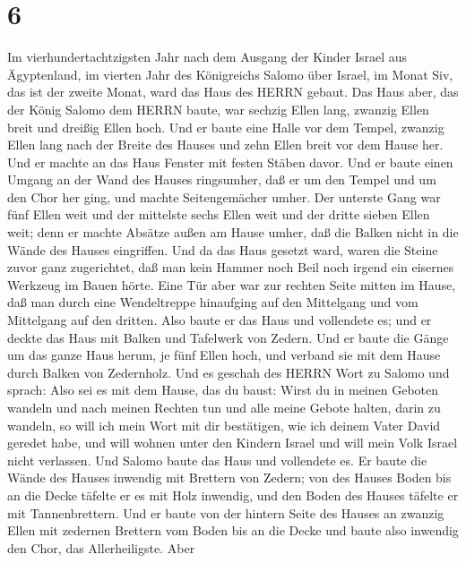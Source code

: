 \hypertarget{section-5}{%
\section{6}\label{section-5}}

 Im vierhundertachtzigsten Jahr nach dem Ausgang der Kinder
Israel aus Ägyptenland, im vierten Jahr des Königreichs Salomo über
Israel, im Monat Siv, das ist der zweite Monat, ward das Haus des HERRN
gebaut.  Das Haus aber, das der König Salomo dem HERRN
baute, war sechzig Ellen lang, zwanzig Ellen breit und dreißig Ellen
hoch.  Und er baute eine Halle vor dem Tempel, zwanzig Ellen
lang nach der Breite des Hauses und zehn Ellen breit vor dem Hause her.
 Und er machte an das Haus Fenster mit festen Stäben davor.
 Und er baute einen Umgang an der Wand des Hauses
ringsumher, daß er um den Tempel und um den Chor her ging, und machte
Seitengemächer umher.  Der unterste Gang war fünf Ellen weit
und der mittelste sechs Ellen weit und der dritte sieben Ellen weit;
denn er machte Absätze außen am Hause umher, daß die Balken nicht in die
Wände des Hauses eingriffen.  Und da das Haus gesetzt ward,
waren die Steine zuvor ganz zugerichtet, daß man kein Hammer noch Beil
noch irgend ein eisernes Werkzeug im Bauen hörte.  Eine Tür
aber war zur rechten Seite mitten im Hause, daß man durch eine
Wendeltreppe hinaufging auf den Mittelgang und vom Mittelgang auf den
dritten.  Also baute er das Haus und vollendete es; und er
deckte das Haus mit Balken und Tafelwerk von Zedern.  Und
er baute die Gänge um das ganze Haus herum, je fünf Ellen hoch, und
verband sie mit dem Hause durch Balken von Zedernholz.  Und
es geschah des HERRN Wort zu Salomo und sprach:  Also sei
es mit dem Hause, das du baust: Wirst du in meinen Geboten wandeln und
nach meinen Rechten tun und alle meine Gebote halten, darin zu wandeln,
so will ich mein Wort mit dir bestätigen, wie ich deinem Vater David
geredet habe,  und will wohnen unter den Kindern Israel und
will mein Volk Israel nicht verlassen.  Und Salomo baute
das Haus und vollendete es.  Er baute die Wände des Hauses
inwendig mit Brettern von Zedern; von des Hauses Boden bis an die Decke
täfelte er es mit Holz inwendig, und den Boden des Hauses täfelte er mit
Tannenbrettern.  Und er baute von der hintern Seite des
Hauses an zwanzig Ellen mit zedernen Brettern vom Boden bis an die Decke
und baute also inwendig den Chor, das Allerheiligste.  Aber
